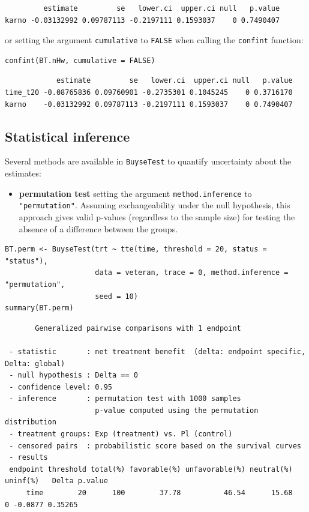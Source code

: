\documentclass[12pt]{article}
\begin{document}
\begin{verbatim}
         estimate         se   lower.ci  upper.ci null   p.value
karno -0.03132992 0.09787113 -0.2197111 0.1593037    0 0.7490407
\end{verbatim}


or setting the argument \texttt{cumulative} to \texttt{FALSE} when calling the
\texttt{confint} function:
\lstset{language=r,label= ,caption= ,captionpos=b,numbers=none}
\begin{lstlisting}
confint(BT.nHw, cumulative = FALSE)
\end{lstlisting}

\begin{verbatim}
            estimate         se   lower.ci  upper.ci null   p.value
time_t20 -0.08765836 0.09760901 -0.2735301 0.1045245    0 0.3716170
karno    -0.03132992 0.09787113 -0.2197111 0.1593037    0 0.7490407
\end{verbatim}


\clearpage

\subsection{Statistical inference}
\label{sec:orgc685fa5}

Several methods are available in \texttt{BuyseTest} to quantify uncertainty
about the estimates:
\begin{itemize}
\item \textbf{permutation test} setting the argument \texttt{method.inference} to
\texttt{"permutation"}. Assuming exchangeability under the null hypothesis,
this approach gives valid p-values (regardless to the sample size)
for testing the absence of a difference between the groups.
\end{itemize}
\lstset{language=r,label= ,caption= ,captionpos=b,numbers=none}
\begin{lstlisting}
BT.perm <- BuyseTest(trt ~ tte(time, threshold = 20, status = "status"),
                     data = veteran, trace = 0, method.inference = "permutation",
                     seed = 10) 
summary(BT.perm)
\end{lstlisting}

\begin{verbatim}
       Generalized pairwise comparisons with 1 endpoint

 - statistic       : net treatment benefit  (delta: endpoint specific, Delta: global) 
 - null hypothesis : Delta == 0 
 - confidence level: 0.95 
 - inference       : permutation test with 1000 samples 
                     p-value computed using the permutation distribution 
 - treatment groups: Exp (treatment) vs. Pl (control) 
 - censored pairs  : probabilistic score based on the survival curves
 - results
 endpoint threshold total(%) favorable(%) unfavorable(%) neutral(%) uninf(%)   Delta p.value 
     time        20      100        37.78          46.54      15.68        0 -0.0877 0.35265
\end{verbatim}
\end{document}
